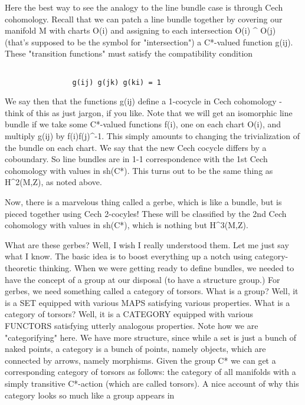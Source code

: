 Here the best way to see the analogy to the line bundle case is through
Cech cohomology.  Recall that we can patch a line bundle together by
covering our manifold M with charts O(i) and assigning to each
intersection O(i) ^ O(j) (that's supposed to be the symbol for
"intersection") a C*-valued function g(ij).  These "transition
functions" must satisfy the compatibility condition


\begin{verbatim}

                g(ij) g(jk) g(ki) = 1
\end{verbatim}
    

We say then that the functions g(ij) define a 1-cocycle in Cech
cohomology - think of this as just jargon, if you like.  Note that we
will get an isomorphic line bundle if we take some C*-valued functions
f(i), one on each chart O(i), and multiply g(ij) by f(i)f(j)^{-1}.  This
simply amounts to changing the trivialization of the bundle on each
chart.  We say that the new Cech cocycle differs by a coboundary.  
So line bundles are in 1-1 correspondence with the 1st Cech cohomology
with values in sh(C*).  This turns out to be the same thing as H^2(M,Z),
as noted above.

Now, there is a marvelous thing called a gerbe, which is like a bundle,
but is pieced together using Cech 2-cocyles!  These will be classified
by the 2nd Cech cohomology with values in sh(C*), which is nothing but
H^3(M,Z).  

What are these gerbes?  Well, I wish I really understood them.  Let me
just say what I know.  The basic idea is to boost everything up a notch
using category-theoretic thinking.  When we were getting ready to define
bundles, we needed to have the concept of a group at our disposal (to
have a structure group.)  For gerbes, we need something called a category
of torsors.  What is a group?  Well, it is a SET equipped with various MAPS
satisfying various properties.  What is a category of torsors?  Well, it is a
CATEGORY equipped with various FUNCTORS satisfying utterly analogous
properties.  Note how we are "categorifying" here.  We have more
structure, since while a set is just a bunch of naked points, a category
is a bunch of points, namely objects, which are connected by arrows,
namely morphisms.  Given the group C* we can get a corresponding category
of torsors as follows: the category of all manifolds with a simply transitive
C*-action (which are called torsors).  A nice account of why this category 
looks so much like a group appears in 

